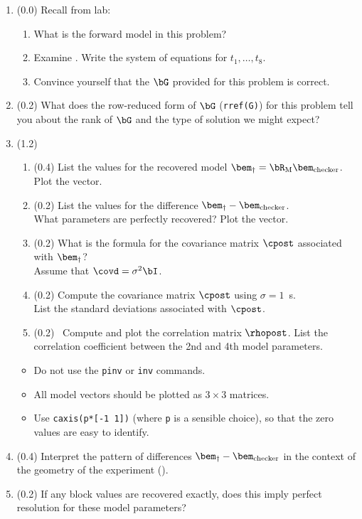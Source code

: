 \documentclass[11pt,titlepage,fleqn]{article}
\begin{document}

\begin{enumerate}

\item (0.0) Recall from lab:
%
\begin{enumerate}
\item What is the forward model in this problem?
\item Examine . Write the system of equations for $t_1, \ldots, t_8$.
\item Convince yourself that the $\bG$ provided for this problem is correct.
\end{enumerate}

\item (0.2) What does the row-reduced form of $\bG$ (\verb+rref(G)+) for this problem tell you about the rank of $\bG$ and the type of solution we might expect?

\item (1.2) 
\begin{enumerate}
\item (0.4) List the values for the recovered model $\bem_{\dagger} = \bR_{\rm M}\bem_{\rm checker}$. Plot the vector.
\item (0.2) List the values for the difference $\bem_{\dagger}-\bem_{\rm checker}$. \\
What parameters are perfectly recovered? Plot the vector.
\item (0.2) What is the formula for the covariance matrix $\cpost$ associated with $\bem_{\dagger}$? \\ Assume that $\covd = \sigma^2\bI$.
\item (0.2) Compute the covariance matrix $\cpost$ using $\sigma = 1$~s. \\
List the standard deviations associated with $\cpost$.
\item (0.2) \ptag\ Compute and plot the correlation matrix $\rhopost$. List the correlation coefficient between the 2nd and 4th model parameters.
\end{enumerate}

\begin{itemize}
\item Do not use the \verb+pinv+ or \verb+inv+ commands.
\item All model vectors should be plotted as $3 \times 3$ matrices.
\item Use \verb+caxis(p*[-1 1])+ (where \verb+p+ is a sensible choice), so that the zero values are easy to identify.
\end{itemize}

\item (0.4) Interpret the pattern of differences $\bem_{\dagger}-\bem_{\rm checker}$ in the context of the geometry of the experiment ().

\item (0.2) If any block values are recovered exactly, does this imply perfect resolution for these model parameters?
\end{enumerate}
\end{document}
